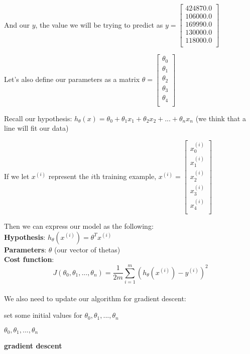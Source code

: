 \documentclass[11pt]{article}
\begin{document}
 And our $y$, the value we will be trying to predict as
\( y = \begin{bmatrix}
424870.0 \\
106000.0 \\
169990.0\\
130000.0\\
118000.0 \\
 \end{bmatrix}
\)

Let's also define our parameters as a matrix $\theta = 
\begin{bmatrix}
\theta_0 \\
\theta_1 \\
\theta_2 \\
\theta_3 \\
\theta_4\\
 \end{bmatrix}
 $

Recall our hypothesis: $h_\theta(x) = \theta_0 + \theta_1x_1+ \theta_2x_2 + ... +  \theta_nx_n$ (we think that a line will fit our data)

If we let  $x^{(i)}$ represent the $i$th training example, $x^{(i)} = $\(\begin{bmatrix}
x_0^{(i)} \\
x_1^{(i)} \\
x_2^{(i)} \\
x_3^{(i)} \\
x_4^{(i)} \\
 \end{bmatrix}\)
 
Then we can express our model as the following:\\

\textbf{Hypothesis}: $h_\theta(x^{(i)}) = \theta^Tx^{(i)}$\\

\textbf{Parameters}: $\theta$ (our vector of thetas)\\

\textbf{Cost function}: 
\[J(\theta_0, \theta_1,..., \theta_n) = \frac{1}{2m} \sum^m_{i=1}(h_\theta(x^{(i)}) - y^{(i)})^2\]\\

We also need to update our algorithm for gradient descent:

    \begin{algorithm}
    \SetAlgoLined
     set some initial values for $\theta_0, \theta_1, ..., \theta_n$ \\
    
	

    \Return $\theta_0, \theta_1, ..., \theta_n$

    \caption{\textbf{gradient descent}}
\end{algorithm} 
\end{document}
